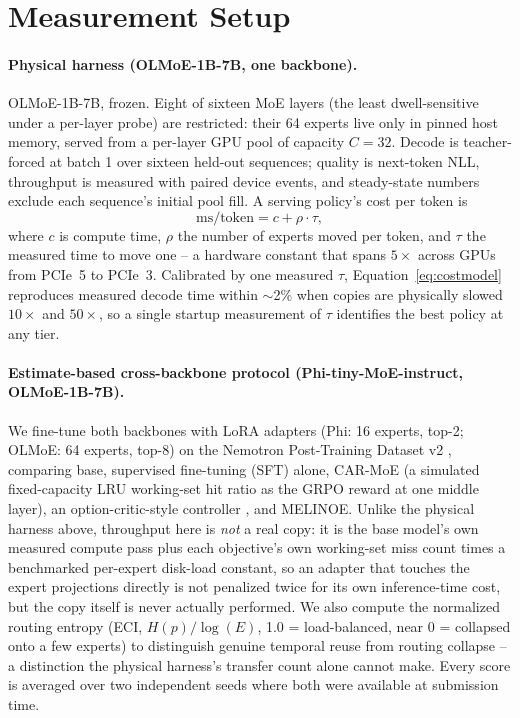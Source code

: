 \documentclass{article}
\begin{document}
\section{Measurement Setup}
\label{sec:setup}

\paragraph{Physical harness (OLMoE-1B-7B, one backbone).} OLMoE-1B-7B, frozen. Eight of
sixteen MoE layers (the least dwell-sensitive under a per-layer probe) are restricted: their
64 experts live only in pinned host memory, served from a per-layer GPU pool of capacity
$C=32$. Decode is teacher-forced at batch 1 over sixteen held-out sequences; quality is
next-token NLL, throughput is measured with paired device events, and steady-state numbers
exclude each sequence's initial pool fill. A serving policy's cost per token is
\begin{equation}
  \text{ms/token} = c + \rho \cdot \tau,
  \label{eq:costmodel}
\end{equation}
where $c$ is compute time, $\rho$ the number of experts moved per token, and $\tau$ the
measured time to move one -- a hardware constant that spans $5\times$ across GPUs from PCIe~5
to PCIe~3. Calibrated by one measured $\tau$, Equation~\ref{eq:costmodel} reproduces measured
decode time within $\sim$2\% when copies are physically slowed $10\times$ and $50\times$, so
a single startup measurement of $\tau$ identifies the best policy at any tier.

\paragraph{Estimate-based cross-backbone protocol (Phi-tiny-MoE-instruct, OLMoE-1B-7B).} We
fine-tune both backbones with LoRA adapters (Phi: 16 experts, top-2; OLMoE: 64 experts,
top-8) on the Nemotron Post-Training Dataset v2 \citep{nvidia2025nemotron}, comparing base,
supervised fine-tuning (SFT) alone, CAR-MoE (a simulated fixed-capacity LRU working-set hit
ratio as the GRPO reward at one middle layer), an option-critic-style controller
\citep{shen2026temporal,bacon2017optioncritic}, and MELINOE. Unlike the physical harness
above, throughput here is \emph{not} a real copy: it is the base model's own measured
compute pass plus each objective's own working-set miss count times a benchmarked per-expert
disk-load constant, so an adapter that touches the expert projections directly is not
penalized twice for its own inference-time cost, but the copy itself is never actually
performed. We also compute the normalized routing entropy (ECI, $H(p)/\log(E)$, 1.0 =
load-balanced, near 0 = collapsed onto a few experts) to distinguish genuine temporal reuse
from routing collapse -- a distinction the physical harness's transfer count alone cannot
make. Every score is averaged over two independent seeds where both were available at
submission time.
\end{document}
